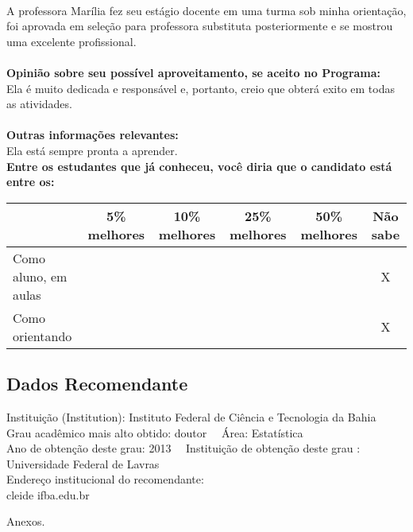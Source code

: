 \documentclass[11pt]{article}
\begin{document}
\\A professora Marília fez seu estágio docente em uma turma sob minha orientação, foi aprovada em seleção para professora substituta posteriormente e se mostrou uma excelente profissional.\\
\\
\textbf{Opinião sobre seu possível aproveitamento, se aceito no Programa:}
\\Ela é muito dedicada e responsável e, portanto, creio que obterá exito em todas as atividades.\\ 
\\
\textbf{Outras informações relevantes:} \\Ela está sempre pronta a aprender.
\\[0.3cm]
\textbf{Entre os estudantes que já conheceu, você diria que o candidato está entre os:}
\\
\begin{tabular}{|l|c|c|c|c|c|}
\hline
 & 5\% melhores & 10\% melhores & 25\% melhores & 50\% melhores & Não sabe \\
\hline
Como aluno, em aulas &  &  &  &  & X\\
\hline
Como orientando &  &  &  &  & X\\
\hline
\end{tabular}
\subsection*{Dados Recomendante} 
	Instituição (Institution): Instituto Federal de Ciência e Tecnologia da Bahia
\\ 
	Grau acadêmico mais alto obtido: doutor
	\ \ Área: Estatística
	\\
	Ano de obtenção deste grau: 2013
	\ \ 
	Instituição de obtenção deste grau : Universidade Federal de Lavras
	\\ 
	Endereço institucional do recomendante: \\ cleide ifba.edu.br 
\begin{center}
Anexos.
\end{center}
\end{document}
